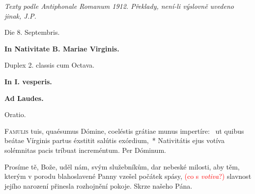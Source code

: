\documentclass[a4paper, twoside]{article}
\newenvironment{titulusOfficii}{\begin{center}}{\end{center}}
\newcommand{\dies}[1]{#1

}
\newcommand{\nomenFesti}[1]{\textbf{\Large #1}

}
\newcommand{\celebratio}[1]{#1

}
\newcommand{\hora}[1]{\textbf{#1}

}
\newcommand{\notitia}[1]{\textcolor{red}{#1}}
\begin{document}
\emph{Texty podle Antiphonale Romanum 1912. Překlady, není-li výslovně uvedeno
jinak, J.P.}

\begin{titulusOfficii}
\dies{Die 8. Septembris.}
\nomenFesti{In Nativitate B. Mariae Virginis.}
\celebratio{Duplex 2. classis cum Octava.}
\end{titulusOfficii}

\hora{In I. vesperis.}

\hora{Ad Laudes.}

Oratio.
\begin{multicols*}{2}
\lettrine{F}{amulis} tuis, quaésumus Dómine, coeléstis grátiae munus impertíre:~\dag\mbox{}
ut quibus beátae Vírginis partus éxstitit salútis exórdium,~*
Nativitátis ejus votíva solémnitas pacis tríbuat increméntum.
Per Dóminum.

\columnbreak

Prosíme tě, Bože, 
uděl nám, svým služebníkům, dar nebeské milosti,
aby těm, kterým v porodu blahoslavené Panny vzešel počátek spásy,
\notitia{(co s \emph{votiva}?)} slavnost jejího narození přinesla
rozhojnění pokoje.
Skrze našeho Pána.
\end{multicols*}
\end{document}
